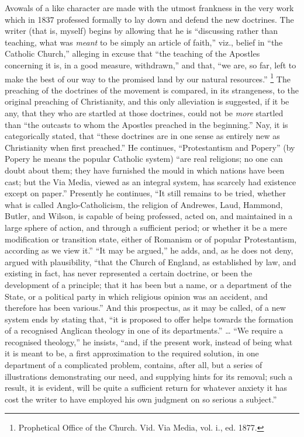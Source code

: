 Avowals of a like character are made with the utmost frankness in
the very work which in 1837 professed formally to lay down and defend
the new doctrines. The writer (that is, myself) begins by allowing
that he is ``discussing rather than teaching, what was \emph{meant}
to be simply an article of faith,'' viz., belief in ``the
Catholic Church,'' alleging in excuse that ``the teaching of
the Apostles concerning it is, in a good measure, withdrawn,'' and
that, ``we are, so far, left to make the best of our way to the
promised land by our natural resources.'' \footnote{Prophetical Office of the
Church. Vid. Via
Media, vol. i., ed. 1877.} The preaching of the doctrines of the movement is compared, in
its strangeness, to the original preaching of Christianity, and this
only alleviation is suggested, if it be any, that they who are
startled at those doctrines, could not be \emph{more} startled than
``the outcasts to whom the Apostles preached in the
beginning.'' Nay, it is categorically stated, that ``these
doctrines are in one sense as entirely new as Christianity when first
preached.'' He continues, ``Protestantism and Popery'' (by
Popery he means the popular Catholic system) ``are real religions;
no one can doubt about them; they have furnished the mould in which
nations have been cast; but the Via Media, viewed as an integral
system, has scarcely had existence except on paper.'' Presently he
continues, ``It still remains to be tried, whether what is called
Anglo-Catholicism, the religion of Andrewes, Laud, Hammond, Butler,
and Wilson, is capable of being professed, acted on, and maintained in
a large sphere of action, and through a sufficient period; or whether
it be a mere modification or transition state, either of Romanism or
of popular Protestantism, according as we view it.'' ``It may
be argued,'' he adds, and, as he does not deny, argued with
plausibility, ``that the Church of England, as established by law,
and existing in fact, has never represented a certain doctrine, or
been the development of a principle; that it has been but a name, or a
department of the State, or a political party in which religious
opinion was an accident, and therefore has been various.'' And
this prospectus, as it may be called, of a new system ends by stating
that, ``it is proposed to offer helps towards the formation of a
recognised Anglican theology in one of its departments.'' …
``We require a recognised theology,'' he insists, ``and, if the
present work, instead of being what it is meant to be, a first
approximation to the required solution, in one department of a
complicated problem, contains, after all, but a series of
illustrations demonstrating our need, and supplying hints for its
removal; such a result, it is evident, will be quite a sufficient
return for whatever anxiety it has cost the writer to have employed
his own judgment on so serious a subject.''

